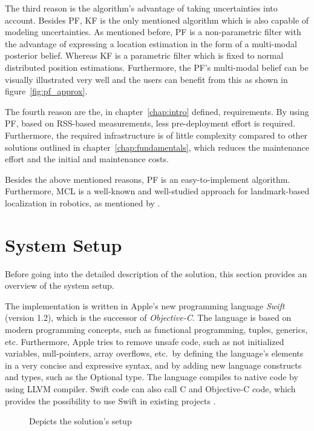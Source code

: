 The third reason is the algorithm's advantage of taking uncertainties into account. Besides \ac{PF}, \ac{KF} is the only mentioned algorithm which is also capable of modeling uncertainties. As mentioned before, \acs{PF} is a non-parametric filter with the advantage of expressing a location estimation in the form of a multi-modal posterior belief. Whereas \ac{KF} is a parametric filter which is fixed to normal distributed position estimations. Furthermore, the \ac{PF}'s multi-modal belief can be visually illustrated very well and the users can benefit from this as shown in figure~\ref{fig:pf_approx}.

The fourth reason are the, in chapter~\ref{chap:intro} defined, requirements. By using \acs{PF}, based on \acs{RSS}-based measurements, less pre-deployment effort is required. Furthermore, the required infrastructure is of little complexity compared to other solutions outlined in chapter~\ref{chap:fundamentals}, which reduces the maintenance effort and the initial and maintenance costs.

Besides the above mentioned reasons, \acl{PF} is an easy-to-implement algorithm. Furthermore, \ac{MCL} is a well-known and well-studied approach for landmark-based localization in robotics, as mentioned by \citet{thrun:prob_robo}.


\section{System Setup}
Before going into the detailed description of the solution, this section provides an overview of the system setup.

The implementation is written in Apple's new programming language \emph{Swift} (version 1.2), which is the successor of \emph{Objective-C}. The language is based on modern programming concepts, such as functional programming, tuples, generics, etc. Furthermore, Apple tries to remove unsafe code, such as not initialized variables, null-pointers, array overflows, etc.\ by defining the language's elements in a very concise and expressive syntax, and by adding new language constructs and types, such as the Optional type. The language compiles to native code by using LLVM compiler. Swift code can also call C and Objective-C code, which provides the possibility to use Swift in existing projects \citep{apple:swift}.

\begin{figure}[height=0.45\textheight]
	
	\caption{Depicts the solution's setup}
	\label{fig:algo_architecture}
\end{figure}

